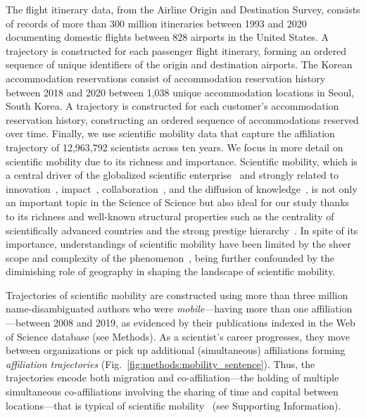 \documentclass[12pt]{article} %
\def\SI{Supporting Information}
\begin{document}
The flight itinerary data, from the Airline Origin and Destination Survey, consists of records of more than 300 million itineraries between 1993 and 2020 documenting domestic flights between 828 airports in the United States. 
A trajectory is constructed for each passenger flight itinerary, forming an ordered sequence of unique identifiers of the origin and destination airports. 
The Korean accommodation reservations consist of accommodation reservation history between 2018 and 2020 between 1,038 unique accommodation locations in Seoul, South Korea.
A trajectory is constructed for each customer's accommodation reservation history, constructing an ordered sequence of accommodations reserved over time.
Finally, we use scientific mobility data that capture the affiliation trajectory of 12,963,792 scientists across ten years.
We focus in more detail on scientific mobility due to its richness and importance. 
Scientific mobility, which is a central driver of the globalized scientific enterprise~\autocite{czaika2018globalisation, altbach2004globalization, box2008competition} and strongly related to innovation~\autocite{braunerhjelm2020labor, kaiser2018innovation, armano2017innovation}, impact~\autocite{sugimoto2017mostimpact, petersen2018multiscale, franzoni2014advantage}, collaboration~\autocite{rodrigues2016mobility}, and the diffusion of knowledge~\autocite{braunerhjelm2020labor, azoulay2011diffusion, morgan2018prestige}, is not only an important topic in the Science of Science but also ideal for our study thanks to its richness and well-known structural properties such as the centrality of scientifically advanced countries and the strong prestige hierarchy~\autocite{auriol2010careers, clauset2015hierarchy, deville2014career}. 
In spite of its importance, understandings of scientific mobility have been limited by the sheer scope and complexity of the phenomenon~\autocite{robinson2019mobility, vannoorden2012mobility, deville2014career, ackers2008mobility, scott2015dynamics}, being further confounded by the diminishing role of geography in shaping the landscape of scientific mobility.

Trajectories of scientific mobility are constructed using more than three million name-disambiguated authors who were \textit{mobile}---having more than one affiliation---between 2008 and 2019, as evidenced by their publications indexed in the Web of Science database (see Methods).
As a scientist's career progresses, they move between organizations or pick up additional (simultaneous) affiliations forming \textit{affiliation trajectories} (Fig.~\ref{fig:methods:mobility_sentence}).
Thus, the trajectories encode both migration and co-affiliation---the holding of multiple simultaneous co-affiliations involving the sharing of time and capital between locations---that is typical of scientific mobility~\autocite{rodrigues2016mobility, markova2016synchronous, sugimoto2017mostimpact} (see \SI).
\end{document}
